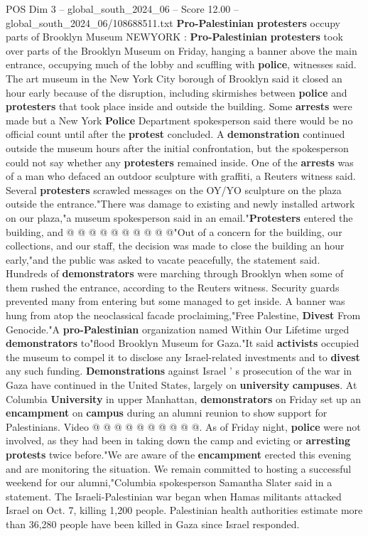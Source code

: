 \begin{textsample}{POS Dim 3 – global\_south\_2024\_06 – Score 12.00 – global\_south\_2024\_06/108688511.txt}  \label{ex:f3_pos_338}
\textbf{Pro-Palestinian} \textbf{protesters} occupy parts of Brooklyn Museum NEWYORK : \textbf{Pro-Palestinian} \textbf{protesters} took over parts of the Brooklyn Museum on Friday, hanging a banner above the main entrance, occupying much of the lobby and scuffling with \textbf{police}, witnesses said.
The art museum in the New York City borough of Brooklyn said it closed an hour early because of the disruption, including skirmishes between \textbf{police} and \textbf{protesters} that took place inside and outside the building.
Some \textbf{arrests} were made but a New York \textbf{Police} Department spokesperson said there would be no official count until after the \textbf{protest} concluded.
A \textbf{demonstration} continued outside the museum hours after the initial confrontation, but the spokesperson could not say whether any \textbf{protesters} remained inside.
One of the \textbf{arrests} was of a man who defaced an outdoor sculpture with graffiti, a Reuters witness said.
Several \textbf{protesters} scrawled messages on the OY/YO sculpture on the plaza outside the entrance."There was damage to existing and newly installed artwork on our plaza,"a museum spokesperson said in an email."\textbf{Protesters} entered the building, and @ @ @ @ @ @ @ @ @ @"Out of a concern for the building, our collections, and our staff, the decision was made to close the building an hour early,"and the public was asked to vacate peacefully, the statement said.
Hundreds of \textbf{demonstrators} were marching through Brooklyn when some of them rushed the entrance, according to the Reuters witness.
Security guards prevented many from entering but some managed to get inside.
A banner was hung from atop the neoclassical facade proclaiming,"Free Palestine, \textbf{Divest} From Genocide."A \textbf{pro-Palestinian} organization named Within Our Lifetime urged \textbf{demonstrators} to"flood Brooklyn Museum for Gaza."It said \textbf{activists} occupied the museum to compel it to disclose any Israel-related investments and to \textbf{divest} any such funding. \textbf{Demonstrations} against Israel ' s prosecution of the war in Gaza have continued in the United States, largely on \textbf{university} \textbf{campuses}.
At Columbia \textbf{University} in upper Manhattan, \textbf{demonstrators} on Friday set up an \textbf{encampment} on \textbf{campus} during an alumni reunion to show support for Palestinians.
Video @ @ @ @ @ @ @ @ @ @.
As of Friday night, \textbf{police} were not involved, as they had been in taking down the camp and evicting or \textbf{arresting} \textbf{protests} twice before."We are aware of the \textbf{encampment} erected this evening and are monitoring the situation.
We remain committed to hosting a successful weekend for our alumni,"Columbia spokesperson Samantha Slater said in a statement.
The Israeli-Palestinian war began when Hamas militants attacked Israel on Oct. 7, killing 1,200 people.
Palestinian health authorities estimate more than 36,280 people have been killed in Gaza since Israel responded.

\end{textsample}
